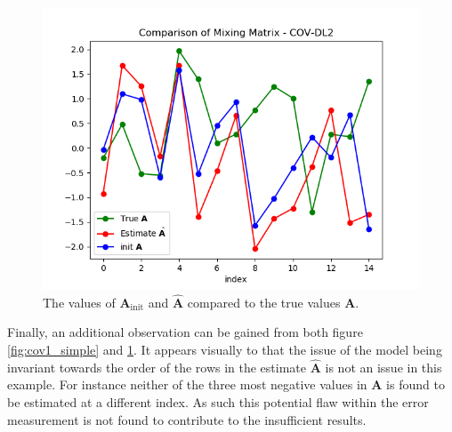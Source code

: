 \begin{figure}[H]
\centering
\includegraphics[scale=0.5]{figures/ch_6/COV2_simple.png}
\caption{The values of $\mathbf{A}_{\text{init}}$ and $\hat{\mathbf{A}}$ compared to the true values $\mathbf{A}$.}
\label{fig:cov2_simple}
\end{figure}

\noindent
Finally, an additional observation can be gained from both figure \ref{fig:cov1_simple} and \ref{fig:cov2_simple}. 
It appears visually to that the issue of the model being invariant towards the order of the rows in the estimate $\hat{\mathbf{A}}$ is not an issue in this example. 
For instance neither of the three most negative values in $\mathbf{A}$ is found to be estimated at a different index. 
As such this potential flaw within the error measurement is not found to contribute to the insufficient results. 

